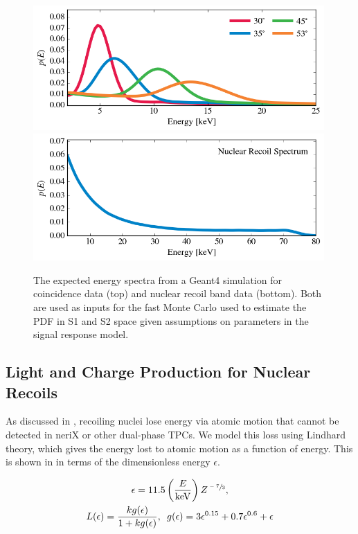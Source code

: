 \begin{figure}[t]
        \centering
	\includegraphics[width=0.99\textwidth]{nerix_energy_spectrum_coin}
	\includegraphics[width=0.99\textwidth]{nerix_energy_spectrum_band}
	\caption{The expected energy spectra from a Geant4 \cite{agostinelli2003geant4} simulation for coincidence data (top) and nuclear recoil band data (bottom).  Both are used as inputs for the fast Monte Carlo used to estimate the PDF in S1 and S2 space given assumptions on parameters in the signal response model.}
	\label{fig:nerix_mc_energy_spectra}
\end{figure}


\subsection{Light and Charge Production for Nuclear Recoils}
\label{sec:nerix_observables_production}

As discussed in , recoiling nuclei lose energy via atomic motion that cannot be detected in neriX or other dual-phase TPCs.  We model this loss using Lindhard theory, which gives the energy lost to atomic motion as a function of energy.  This is shown in  in terms of the dimensionless energy $\epsilon$.

\begin{equation}
        \label{eqn:nerix_lindhard}
        \begin{gathered}
                \epsilon = 11.5 \left( \frac{E}{\textrm{keV}} \right) Z^{\sfrac{-7}{3}}, \\
                L(\epsilon) = \frac{k g(\epsilon)}{1 + k g(\epsilon)}, \, \, \, g(\epsilon) = 3 \epsilon^{0.15} + 0.7 \epsilon^{0.6} + \epsilon
        \end{gathered}
\end{equation}

